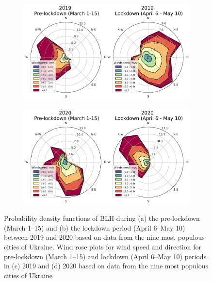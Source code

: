 \begin{figure}[p]
\begin{subfigure}{.5\textwidth}
        \centering
        \includegraphics[width=\textwidth]{figs/chap3/fig4_a_2019.png}
        \caption{}
        \label{fig:chap3_fig4a}
    \end{subfigure}%
    \begin{subfigure}{.5\textwidth}
        \centering
        \includegraphics[width=\textwidth]{figs/chap3/fig4_b_2020.png}
        \caption{}
        \label{fig:chap3_fig4b}
    \end{subfigure}
    \caption[Meteorological variations during pre-lockdown and lockdown]{Probability density functions of BLH during (a) the pre-lockdown (March 1–15) and (b) the lockdown period (April 6–May 10) between 2019 and 2020 based on data from the nine most populous cities of Ukraine. Wind rose plots for wind speed and direction for pre-lockdown (March 1–15) and lockdown (April 6–May 10) periods in (c) 2019 and (d) 2020 based on data from the nine most populous cities of Ukraine}
    \label{fig:chap3_fig34}
\end{figure}

